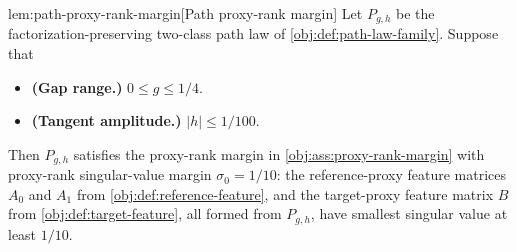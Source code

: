 \documentclass[11pt]{article}
\begin{document}
\begin{lemmav}{lem:path-proxy-rank-margin}[Path proxy-rank margin]
Let \(P_{g,h}\) be the factorization-preserving two-class path law of \cref{obj:def:path-law-family}. Suppose that
\begin{itemize}
\item \textbf{(Gap range.)} \(0\le g\le 1/4\).
\item \textbf{(Tangent amplitude.)} \(|h|\le 1/100\).
\end{itemize}
Then \(P_{g,h}\) satisfies the proxy-rank margin in \cref{obj:ass:proxy-rank-margin} with proxy-rank singular-value margin \(\sigma_0=1/10\): the reference-proxy feature matrices \(A_0\) and \(A_1\) from \cref{obj:def:reference-feature}, and the target-proxy feature matrix \(B\) from \cref{obj:def:target-feature}, all formed from \(P_{g,h}\), have smallest singular value at least \(1/10\).
\end{lemmav}
\end{document}
